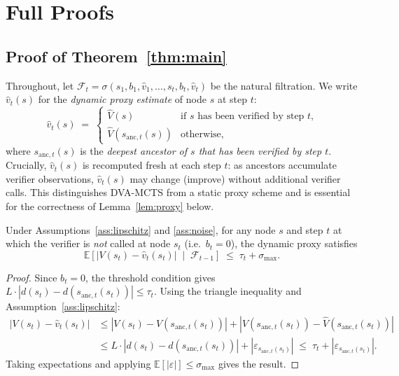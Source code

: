 \appendix

\section{Full Proofs}
\label{app:proofs}

\subsection{Proof of Theorem~\ref{thm:main}}
\label{app:main_proof}

Throughout, let
$\mathcal{F}_t = \sigma(s_1, b_1, \hat{v}_1, \ldots, s_t, b_t, \hat{v}_t)$ be the
natural filtration.  We write $\hat{v}_t(s)$ for the \emph{dynamic proxy estimate}
of node $s$ at step $t$:
\[
  \hat{v}_t(s) \;=\;
  \begin{cases}
    \hat{V}(s) & \text{if $s$ has been verified by step $t$,} \\
    \hat{V}(s_{\mathrm{anc},t}(s)) & \text{otherwise,}
  \end{cases}
\]
where $s_{\mathrm{anc},t}(s)$ is the \emph{deepest ancestor of $s$ that has been
verified by step $t$}.  Crucially, $\hat{v}_t(s)$ is recomputed fresh at each step $t$:
as ancestors accumulate verifier observations, $\hat{v}_t(s)$ may change (improve)
without additional verifier calls.  This distinguishes DVA-MCTS from a static
proxy scheme and is essential for the correctness of Lemma~\ref{lem:proxy} below.

\begin{lemma}
\label{lem:proxy}
Under Assumptions~\ref{ass:lipschitz} and \ref{ass:noise}, for any node $s$ and
step $t$ at which the verifier is \emph{not} called at node $s_t$ (i.e.\ $b_t = 0$),
the dynamic proxy satisfies
\[
  \mathbb{E}\!\left[
    |V(s_t) - \hat{v}_t(s_t)| \;\middle|\; \mathcal{F}_{t-1}
  \right]
  \;\leq\; \tau_t + \sigma_{\max}.
\]
\end{lemma}

\begin{proof}
Since $b_t = 0$, the threshold condition gives
$L \cdot |d(s_t) - d(s_{\mathrm{anc},t}(s_t))| \leq \tau_t$.
Using the triangle inequality and Assumption~\ref{ass:lipschitz}:
\begin{align*}
  |V(s_t) - \hat{v}_t(s_t)|
  &\leq |V(s_t) - V(s_{\mathrm{anc},t}(s_t))|
        + |V(s_{\mathrm{anc},t}(s_t)) - \hat{V}(s_{\mathrm{anc},t}(s_t))|\\
  &\leq L \cdot |d(s_t) - d(s_{\mathrm{anc},t}(s_t))|
        + |\varepsilon_{s_{\mathrm{anc},t}(s_t)}|
  \;\leq\; \tau_t + |\varepsilon_{s_{\mathrm{anc},t}(s_t)}|.
\end{align*}
Taking expectations and applying $\mathbb{E}[|\varepsilon|] \leq \sigma_{\max}$ gives
the result.
\end{proof}

